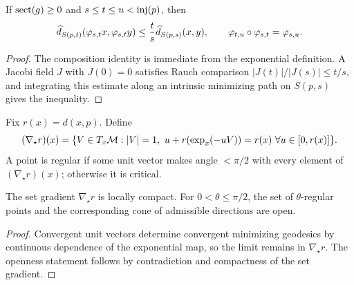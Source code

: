 \begin{proposition}
\label{prop:chow-iii-i29-small-sphere-monotonicity}

If $\operatorname{sect}(g)\ge0$ and $s\le t\le u<\operatorname{inj}(p)$, then
\[
\widehat d_{S(p,t)}(\varphi_{s,t}x,\varphi_{s,t}y)
\le\frac ts\widehat d_{S(p,s)}(x,y),\qquad
\varphi_{t,u}\circ\varphi_{s,t}=\varphi_{s,u}.
\]
\end{proposition}
\begin{proof}
\sketch
The composition identity is immediate from the exponential definition.  A
Jacobi field $J$ with $J(0)=0$ satisfies Rauch comparison
$|J(t)|/|J(s)|\le t/s$, and integrating this estimate along an intrinsic
minimizing path on $S(p,s)$ gives the inequality.
\end{proof}

\begin{definition}
\label{def:chow-iii-i30-i31-gradient-regularity}
Fix $r(x)=d(x,p)$.  Define
\[
(\nabla_\star r)(x)=\{V\in T_x\mathcal M:|V|=1,\ u+r(\exp_x(-uV))=r(x)\ \forall u\in[0,r(x)]\}.
\]
A point is regular if some unit vector makes angle $<\pi/2$ with every element
of $(\nabla_\star r)(x)$; otherwise it is critical.
\end{definition}

\begin{lemma}
\label{lem:chow-iii-i30-i33-regular-open}

The set gradient $\nabla_\star r$ is locally compact.  For
$0<\theta\le\pi/2$, the set of $\theta$-regular points and the corresponding
cone of admissible directions are open.
\end{lemma}
\begin{proof}
\sketch
Convergent unit vectors determine convergent minimizing geodesics by continuous
dependence of the exponential map, so the limit remains in $\nabla_\star r$.
The openness statement follows by contradiction and compactness of the set
gradient.
\end{proof}

